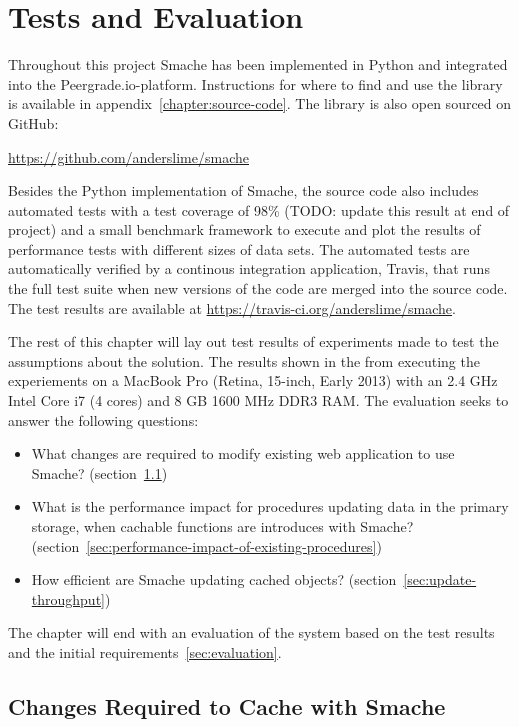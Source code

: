 \chapter{Tests and Evaluation}
\label{chapter:evaluation}

Throughout this project Smache has been implemented in Python and integrated into the Peergrade.io-platform. Instructions for where to find and use the library is available in appendix~\ref{chapter:source-code}. The library is also open sourced on GitHub:

\url{https://github.com/anderslime/smache}

Besides the Python implementation of Smache, the source code also includes automated tests with a test coverage of 98\% (TODO: update this result at end of project) and a small benchmark framework to execute and plot the results of performance tests with different sizes of data sets. The automated tests are automatically verified by a continous integration application, Travis, that runs the full test suite when new versions of the code are merged into the source code. The test results are available at \url{https://travis-ci.org/anderslime/smache}.

The rest of this chapter will lay out test results of experiments made to test the assumptions about the solution. The results shown in the from executing the experiements on a MacBook Pro (Retina, 15-inch, Early 2013) with an 2.4 GHz Intel Core i7 (4 cores) and 8 GB 1600 MHz DDR3 RAM. The evaluation seeks to answer the following questions:

\begin{itemize}
  \item What changes are required to modify existing web application to use Smache? (section~\ref{sec:changes-required-to-cache-with-smache})
  \item What is the performance impact for procedures updating data in the primary storage, when cachable functions are introduces with Smache? (section~\ref{sec:performance-impact-of-existing-procedures})
  \item How efficient are Smache updating cached objects? (section~\ref{sec:update-throughput})
\end{itemize}

The chapter will end with an evaluation of the system based on the test results and the initial requirements~\ref{sec:evaluation}.

\section{Changes Required to Cache with Smache}
\label{sec:changes-required-to-cache-with-smache}

